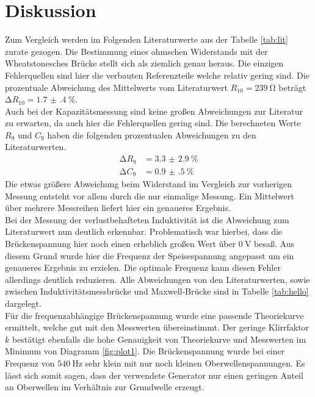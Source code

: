 \section{Diskussion}
Zum Vergleich werden im Folgenden Literaturwerte aus der Tabelle \ref{tab:lit} zurate gezogen.
Die Bestimmung eines ohmschen Widerstands mit der Wheatstonesches Brücke stellt sich als ziemlich genau heraus. Die einzigen Fehlerquellen sind
hier die verbauten Referenzteile welche relativ gering sind. Die prozentuale Abweichung des Mittelwerts vom Literaturwert $R_{10} =\SI{239}{\ohm}$ beträgt 
$\increment R_{10} = \SI{1.7(4)}{\percent}$.
\\
\newline
Auch bei der Kapazitätsmessung sind keine großen Abweichungen zur Literatur zu erwarten, da auch hier die Fehlerquellen gering sind. Die berechneten Werte $R_{9}$ und $C_{9}$
haben die folgenden prozentualen Abweichungen zu den Literaturwerten. 
\begin{align*}
\increment R_{9} &= \SI{3.3(29)}{\percent} \\
\increment C_{9} &= \SI{0.9(5)}{\percent}
\end{align*}
Die etwas größere Abweichung beim Widerstand im Vergleich zur vorherigen Messung entsteht vor allem durch die nur einmalige Messung. Ein Mittelwert über mehrere Messreihen liefert hier ein genaueres Ergebnis.
\\
\newline
Bei der Messung der verlustbehafteten Induktivität ist die Abweichung zum Literaturwert nun deutlich erkennbar. Problematisch war hierbei, dass die Brückenspannung hier noch einen erheblich
großen Wert über $\SI{0}{\volt}$ besaß. Aus diesem Grund wurde hier die Frequenz der Speisespannung angepasst um ein genaueres Ergebnis zu erzielen. Die optimale Frequenz kann diesen Fehler
allerdings deutlich reduzieren. Alle Abweichungen von den Literaturwerten, sowie zwischen Induktivitätsmessbrücke und Maxwell-Brücke sind in Tabelle \ref{tab:hello} dargelegt.
\\
\newline
Für die frequenzabhängige Brückenspannung wurde eine passende Theoriekurve ermittelt, welche gut mit den Messwerten übereinstimmt. Der geringe Klirrfaktor $k$ bestätigt ebenfalls
die hohe Genauigkeit von Theoriekurve und Messwerten im Minimum von Diagramm \ref{fig:plot1}. Die Brückenspannung wurde bei einer Frequenz von $\SI{540}{\hertz}$ sehr klein mit nur noch kleinen Oberwellenspannungen. Es lässt 
sich somit sagen, dass der verwendete Generator nur einen geringen Anteil an Oberwellen im Verhältnis zur Grundwelle erzeugt.